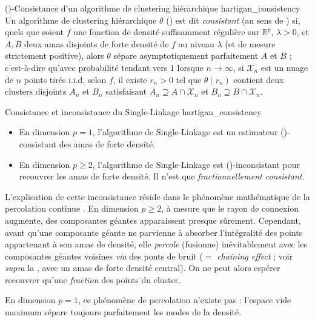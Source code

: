 \begin{Definition}{()-Consistance d'un algorithme de clustering hiérarchique \cite{hartigan81}}{hartigan_consistency}
Un algorithme de clustering hiérarchique $\theta$ () est dit \emph{consistant} (au sens de ) si, quels que soient $f$ une fonction de densité suffisamment régulière sur $\mathbb R^p$,  $\lambda > 0$, et $A,B$ deux amas disjoints de forte densité de $f$ au niveau $\lambda$ (et de mesure strictement positive), alors $\theta$ sépare asymptotiquement parfaitement $A$ et $B$ ;  c'est-à-dire qu'avec probabilité tendant vers $1$ lorsque $n\to \infty$, si $\mathcal X_n$ est un nuage de $n$ points tirés i.i.d. selon $f$, il existe $r_n > 0$ tel que $\theta(r_n)$ contient deux clusters disjoints $A_n$ et $B_n$ satisfaisant $A_n \supseteq A \cap \mathcal X_n$ et $B_n \supseteq B \cap \mathcal X_n$.
\end{Definition}

\begin{Resultat}{Consistance et inconsistance du Single-Linkage \cite{hartigan81}}{hartigan_consistency}
\begin{itemize}
    \item En dimension $p=1$, l'algorithme de Single-Linkage est un estimateur ()-{consistant} des amas de forte densité.
    \item En dimension $p \ge 2$, l'algorithme de Single-Linkage est ()-{inconsistant} pour recouvrer les amas de forte densité. Il n'est que \emph{fractionnellement consistant}.
\end{itemize}
\end{Resultat}

L'explication de cette inconsistance réside dans le phénomène mathématique de {la percolation continue} \cite{MeesterRoy, penrose2003}. En dimension $p \ge 2$, à mesure que le rayon de connexion augmente, des composantes géantes apparaissent presque sûrement. Cependant, avant qu'une composante géante ne parvienne à absorber l'intégralité des points appartenant à son amas de densité, elle \emph{percole} (fusionne) inévitablement avec les composantes géantes voisines \emph{via} des ponts de bruit ($=$ \emph{chaining effect} ; voir \emph{supra} la , avec un amas de forte densité central). On ne peut alors espérer recouvrer qu'une \emph{fraction} des points du cluster. 


En dimension $p=1$, ce phénomène de percolation n'existe pas : l'espace vide maximum sépare toujours parfaitement les modes de la densité.


